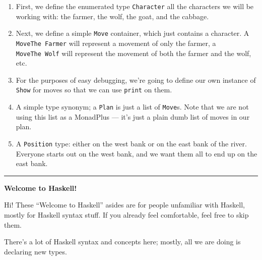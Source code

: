 \documentclass[]{article}
\begin{document}
\begin{enumerate}
\def\labelenumi{\arabic{enumi}.}
\tightlist
\item
  First, we define the enumerated type \texttt{Character} all the characters we
  will be working with: the farmer, the wolf, the goat, and the cabbage.
\item
  Next, we define a simple \texttt{Move} container, which just contains a
  character. A \texttt{MoveThe\ Farmer} will represent a movement of only the
  farmer, a \texttt{MoveThe\ Wolf} will represent the movement of both the
  farmer and the wolf, etc.
\item
  For the purposes of easy debugging, we're going to define our own instance of
  \texttt{Show} for moves so that we can use \texttt{print} on them.
\item
  A simple type synonym; a \texttt{Plan} is just a list of \texttt{Move}s. Note
  that we are not using this list as a MonadPlus --- it's just a plain dumb list
  of moves in our plan.
\item
  A \texttt{Position} type: either on the west bank or on the east bank of the
  river. Everyone starts out on the west bank, and we want them all to end up on
  the east bank.
\end{enumerate}

\begin{center}\rule{0.5\linewidth}{\linethickness}\end{center}

\textbf{Welcome to Haskell!}

Hi! These ``Welcome to Haskell'' asides are for people unfamiliar with Haskell,
mostly for Haskell syntax stuff. If you already feel comfortable, feel free to
skip them.

There's a lot of Haskell syntax and concepts here; mostly, all we are doing is
declaring new types.
\end{document}
